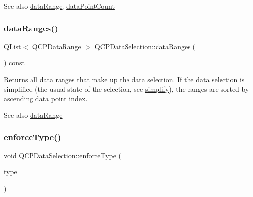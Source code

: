 \begin{DoxySeeAlso}{See also}
\hyperlink{class_q_c_p_data_selection_a6956acf6a9a49a353b4f9b58608978ad}{data\+Range}, \hyperlink{class_q_c_p_data_selection_ac9e74dd294778aa799216c3435c9c4f0}{data\+Point\+Count} 
\end{DoxySeeAlso}
\mbox{\label{class_q_c_p_data_selection_ac3b1c5e7713d380cd9e447f4556b94da}} 
\subsubsection{\texorpdfstring{data\+Ranges()}{dataRanges()}}
{\footnotesize\ttfamily \hyperlink{class_q_list}{Q\+List}$<$ \hyperlink{class_q_c_p_data_range}{Q\+C\+P\+Data\+Range} $>$ Q\+C\+P\+Data\+Selection\+::data\+Ranges (\begin{DoxyParamCaption}{ }\end{DoxyParamCaption}) const\hspace{0.3cm}{\ttfamily [inline]}}

Returns all data ranges that make up the data selection. If the data selection is simplified (the usual state of the selection, see \hyperlink{class_q_c_p_data_selection_a4a2fbad1a6e4d1dd26fdfdf88956f2a4}{simplify}), the ranges are sorted by ascending data point index.

\begin{DoxySeeAlso}{See also}
\hyperlink{class_q_c_p_data_selection_a6956acf6a9a49a353b4f9b58608978ad}{data\+Range} 
\end{DoxySeeAlso}
\mbox{\label{class_q_c_p_data_selection_a17b84d852911531d229f4a76aa239a75}} 
\subsubsection{\texorpdfstring{enforce\+Type()}{enforceType()}}
{\footnotesize\ttfamily void Q\+C\+P\+Data\+Selection\+::enforce\+Type (\begin{DoxyParamCaption}\item[{\hyperlink{namespace_q_c_p_ac6cb9db26a564b27feda362a438db038}{Q\+C\+P\+::\+Selection\+Type}}]{type }\end{DoxyParamCaption})}

